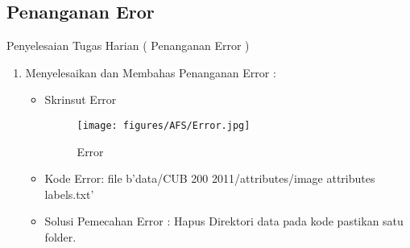 \par
\par
\subsection{Penanganan Eror}
Penyelesaian Tugas Harian  ( Penanganan Error )
\begin{enumerate}
\item Menyelesaikan dan Membahas Penanganan Error :
\begin{itemize}
\item Skrinsut Error

\begin{figure}[ht]
\centering
\texttt{[image: figures/AFS/Error.jpg]}
\caption{Error}
\label{contoh}
\end{figure}
\end{itemize}

\begin{itemize}
\item Kode Error: file b'data/CUB 200 2011/attributes/image attributes labels.txt'
\par 
\item Solusi Pemecahan Error : Hapus Direktori data pada kode pastikan satu folder.
\par 
\par
\end{itemize}
\end{enumerate}
